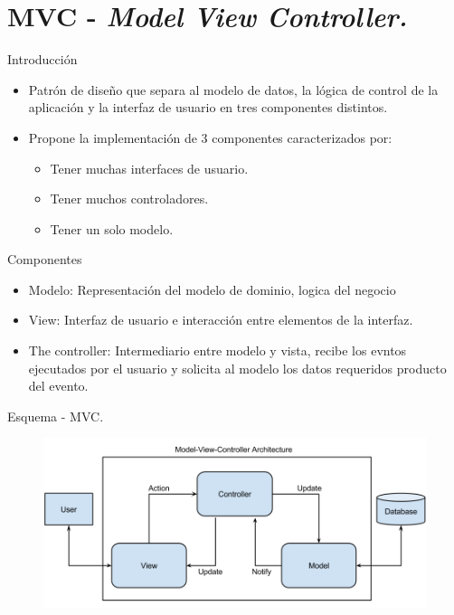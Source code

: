 \section{MVC - \emph{Model View Controller.}}
\begin{frame}{Introducci\'on}
\begin{block}{}
	\begin{itemize}
		\item Patr\'on de diseño que separa al modelo de datos, la lógica de control de la aplicaci\'on y la interfaz de usuario en tres componentes distintos.
		\item Propone la implementaci\'on de 3 componentes caracterizados por:
			\begin{itemize}
				\item Tener muchas interfaces de usuario.
				\item Tener muchos controladores.
				\item Tener un solo modelo.
			\end{itemize}
	\end{itemize}
\end{block}
\end{frame}

\begin{frame}{Componentes}
	\begin{itemize}
		\item Modelo: Representaci\'on del modelo de dominio,  logica del negocio
		\item View: Interfaz de usuario e interacci\'on entre elementos de la interfaz.
		\item The controller: Intermediario entre modelo y vista, recibe los evntos ejecutados por el usuario y solicita al modelo los datos requeridos producto del evento.
		\end{itemize}
\end{frame}

\begin{frame}{Esquema - MVC.}
  \begin{figure}
    \includegraphics[scale=0.3]{figuras/Model-View-Controller-High-Level-Diagram.png}
  \end{figure}
\end{frame}

